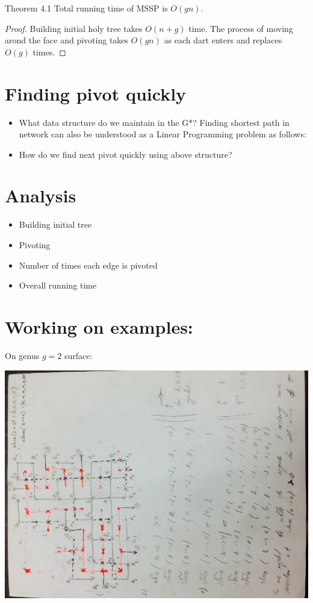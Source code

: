 \documentclass{article}
\begin{document}
\begin{oneshot}{Theorem 4.1}
Total running time of MSSP is $O(gn)$.
\end{oneshot}
\begin{proof}
Building initial holy tree takes $O(n + g)$ time. The process of moving arond the
face and pivoting takes $O(gn)$ as each dart enters and replaces $O(g)$ times.
\end{proof}

\section{Finding pivot quickly}
\begin{itemize}
\item What data structure do we maintain in the G*?
Finding shortest path in network can also be understood as a Linear Programming 
problem as follows:
\item How do we find next pivot quickly using above structure?
\end{itemize}

\section{Analysis}
\begin{itemize}
\item Building initial tree
\item Pivoting
\item Number of times each edge is pivoted
\item Overall running time
\end{itemize}

\iffalse
\newpage
\section{Working on examples:}

On genus $g = 2$ surface:
\begin{center}
\includegraphics[angle = -90, scale = 0.7]{figures/genus2.jpg}
\end{center}
\end{document}
